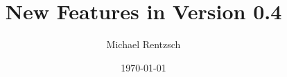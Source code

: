 \documentclass{beamer}
\title{New Features in Version 0.4}
\author{Michael Rentzsch}
\date{\today}
\begin{document}
\frame{\titlepage}


\end{document}
